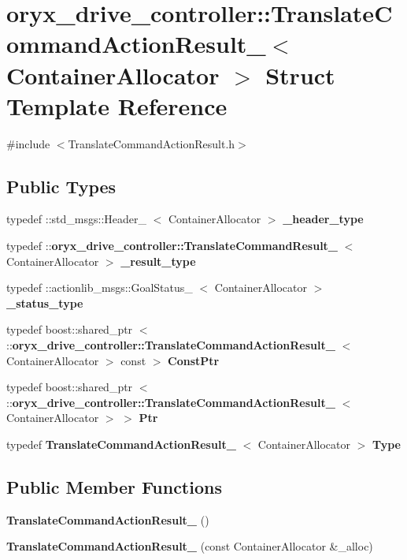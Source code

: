 \section{oryx\-\_\-drive\-\_\-controller\-:\-:\-Translate\-Command\-Action\-Result\-\_\-$<$ \-Container\-Allocator $>$ \-Struct \-Template \-Reference}
\label{structoryx__drive__controller_1_1TranslateCommandActionResult__}


{\ttfamily \#include $<$\-Translate\-Command\-Action\-Result.\-h$>$}

\subsection*{\-Public \-Types}
\begin{DoxyCompactItemize}
\item 
typedef \-::std\-\_\-msgs\-::\-Header\-\_\-\*
$<$ \-Container\-Allocator $>$ {\bf \-\_\-header\-\_\-type}
\item 
typedef \*
\-::{\bf oryx\-\_\-drive\-\_\-controller\-::\-Translate\-Command\-Result\-\_\-}\*
$<$ \-Container\-Allocator $>$ {\bf \-\_\-result\-\_\-type}
\item 
typedef \*
\-::actionlib\-\_\-msgs\-::\-Goal\-Status\-\_\-\*
$<$ \-Container\-Allocator $>$ {\bf \-\_\-status\-\_\-type}
\item 
typedef boost\-::shared\-\_\-ptr\*
$<$ \-::{\bf oryx\-\_\-drive\-\_\-controller\-::\-Translate\-Command\-Action\-Result\-\_\-}\*
$<$ \-Container\-Allocator $>$ const  $>$ {\bf \-Const\-Ptr}
\item 
typedef boost\-::shared\-\_\-ptr\*
$<$ \-::{\bf oryx\-\_\-drive\-\_\-controller\-::\-Translate\-Command\-Action\-Result\-\_\-}\*
$<$ \-Container\-Allocator $>$ $>$ {\bf \-Ptr}
\item 
typedef \*
{\bf \-Translate\-Command\-Action\-Result\-\_\-}\*
$<$ \-Container\-Allocator $>$ {\bf \-Type}
\end{DoxyCompactItemize}
\subsection*{\-Public \-Member \-Functions}
\begin{DoxyCompactItemize}
\item 
{\bf \-Translate\-Command\-Action\-Result\-\_\-} ()
\item 
{\bf \-Translate\-Command\-Action\-Result\-\_\-} (const \-Container\-Allocator \&\-\_\-alloc)
\end{DoxyCompactItemize}
